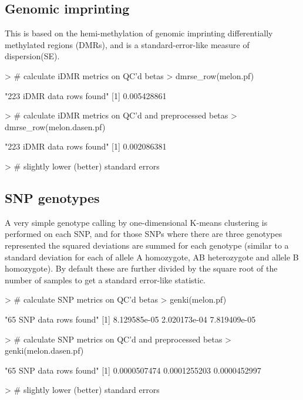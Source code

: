 \documentclass[11pt]{article}
\begin{document}
\subsection{Genomic imprinting}
This is based on the hemi-methylation of genomic imprinting differentially methylated 
regions (DMRs), and is a standard-error-like measure of dispersion(SE).

\begin{Schunk}
\begin{Sinput}
> # calculate iDMR metrics on QC'd betas
> dmrse_row(melon.pf)              
\end{Sinput}
\begin{Soutput}
[1] "223 iDMR data rows found"
[1] 0.005428861
\end{Soutput}
\begin{Sinput}
> # calculate iDMR metrics on QC'd and preprocessed betas
> dmrse_row(melon.dasen.pf)        
\end{Sinput}
\begin{Soutput}
[1] "223 iDMR data rows found"
[1] 0.002086381
\end{Soutput}
\begin{Sinput}
> # slightly lower (better) standard errors  
\end{Sinput}
\end{Schunk}

\subsection{SNP genotypes}
A very simple genotype calling by one-dimensional K-means clustering is 
performed on each SNP, and for those SNPs where there are three genotypes 
represented the squared deviations are summed for each genotype (similar 
to a standard deviation for each of allele A homozygote, AB heterozygote and 
allele B homozygote).  By default these are further divided by the square root
of the number of samples to get a standard error-like statistic. 

\begin{Schunk}
\begin{Sinput}
> # calculate SNP metrics on QC'd betas
> genki(melon.pf)              
\end{Sinput}
\begin{Soutput}
[1] "65 SNP data rows found"
[1] 8.129585e-05 2.020173e-04 7.819409e-05
\end{Soutput}
\begin{Sinput}
> # calculate SNP metrics on QC'd and preprocessed betas
> genki(melon.dasen.pf)        
\end{Sinput}
\begin{Soutput}
[1] "65 SNP data rows found"
[1] 0.0000507474 0.0001255203 0.0000452997
\end{Soutput}
\begin{Sinput}
> # slightly lower (better) standard errors  
\end{Sinput}
\end{Schunk}
\end{document}
